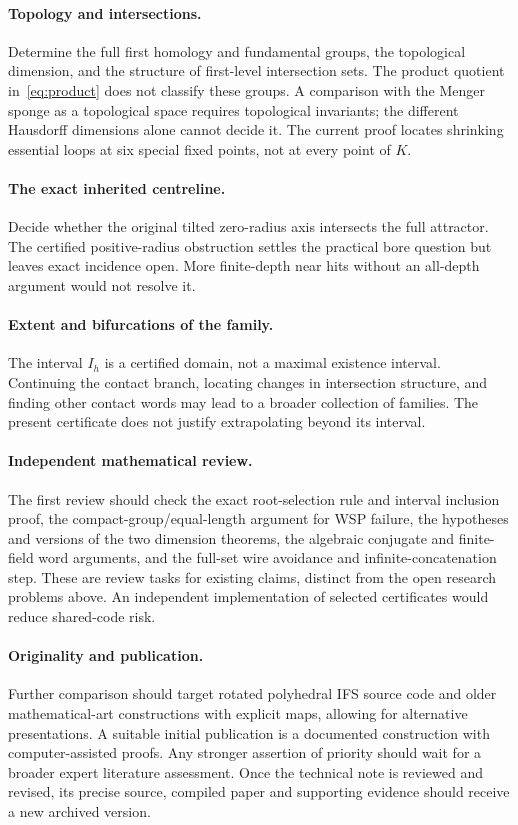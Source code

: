 \paragraph{Topology and intersections.}
Determine the full first homology and fundamental groups, the topological
dimension, and the structure of first-level intersection sets. The product
quotient in~\eqref{eq:product} does not classify these groups. A comparison
with the Menger sponge as a topological space requires topological
invariants; the different Hausdorff dimensions alone cannot decide it.
The current proof locates shrinking essential loops at six special fixed
points, not at every point of $K$.

\paragraph{The exact inherited centreline.}
Decide whether the original tilted zero-radius axis intersects the full
attractor. The certified positive-radius obstruction settles the practical
bore question but leaves exact incidence open. More finite-depth near hits
without an all-depth argument would not resolve it.

\paragraph{Extent and bifurcations of the family.}
The interval $I_h$ is a certified domain, not a maximal existence interval.
Continuing the contact branch, locating changes in intersection structure,
and finding other contact words may lead to a broader collection of families.
The present certificate does not justify extrapolating beyond its interval.

\paragraph{Independent mathematical review.}
The first review should check the exact root-selection rule and interval
inclusion proof, the compact-group/equal-length argument for WSP failure,
the hypotheses and versions of the two dimension theorems, the algebraic
conjugate and finite-field word arguments, and the full-set wire avoidance
and infinite-concatenation step. These are review tasks for existing claims,
distinct from the open research problems above. An independent
implementation of selected certificates would reduce shared-code risk.

\paragraph{Originality and publication.}
Further comparison should target rotated polyhedral IFS source code and
older mathematical-art constructions with explicit maps, allowing for
alternative presentations. A suitable initial publication is a documented
construction with computer-assisted proofs. Any stronger assertion of
priority should wait for a broader expert literature assessment. Once the
technical note is reviewed and revised, its precise source, compiled paper
and supporting evidence should receive a new archived version.

